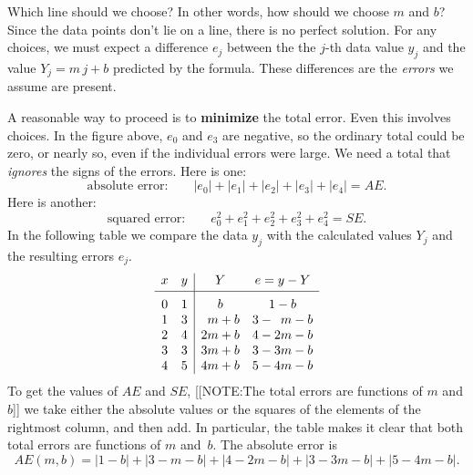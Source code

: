 Which line should we choose?  In other words, how should we choose $m$
and $b$?  Since the data points don't lie on a line, there is no
perfect solution.  For any choices, we must expect a difference $e_j$
between the the $j$-th data value $y_j$ and the value $Y_j = m \, j +
b$ predicted by the formula.  These differences are the {\em errors\/}
we assume are present.

A reasonable way to proceed is to {\bf minimize} the total error.
Even this involves choices.  In the figure above, $e_0$ and $e_3$ are
negative, so the ordinary total could be zero, or nearly so, even if
the individual errors were large.  We need a total that {\em
  ignores\/} the signs of the errors.  Here is one:
        \[
\mbox{absolute error:} \qquad 
                |e_0| + |e_1| + |e_2| + |e_3| + |e_4| = AE.
\]
Here is another:
        \[
\mbox{squared error:} \qquad 
                e_0^2 + e_1^2 + e_2^2 + e_3^2 + e_4^2 = SE.
\] 
In the following table we compare the data $y_j$ with the calculated values $Y_j$ and the resulting errors $e_j$.
\addtolength{\arraycolsep}{8pt}
        \[
\begin{array}{cc|cc} 
        x & y & Y & e = y - Y \\ [2pt]
        \hline
        0 & 1 & \rule{0pt}{13pt}b & 1-b    \\
        1 & 3 & \hphantom{1}m+b & 3-\hphantom{1}m-b \\
        2 & 4 & 2m+b & 4-2m-b \\
        3 & 3 & 3m+b & 3-3m-b \\
        4 & 5 & 4m+b & 5-4m-b
        \end{array}
\]
\addtolength{\arraycolsep}{-8pt}%
To get the values of $AE$ and $SE$, 
[[NOTE:The total errors are functions of $m$ and $b$]]
we take either the absolute values or the squares of the elements of
the rightmost column, and then add.  In particular, the table makes it
clear that both total errors are functions of $m$ and~$b$.  The
absolute error is
        \[
AE(m, b) = |1-b| + |3-m-b| + |4-2m-b| + |3-3m-b| + |5-4m-b|.
\]



